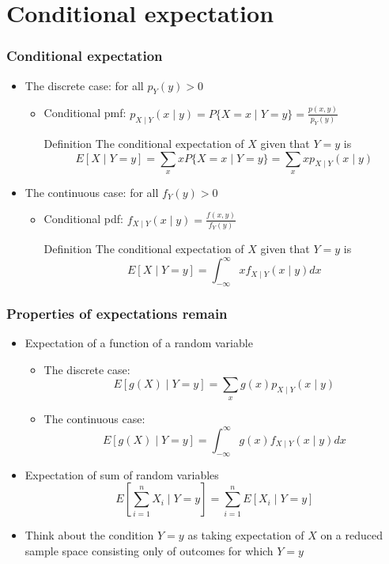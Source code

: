 \documentclass[slidestop,compress,mathserif]{beamer}
\begin{document}
\section{Conditional expectation}
\begin{frame}\frametitle{Conditional expectation}
\begin{itemize}
\item The discrete case: for all $p_Y(y) > 0$
\begin{itemize}
\item Conditional pmf: $p_{X \mid Y}(x \mid y) = P\{X = x \mid  Y = y\} = \frac{p(x, y)}{p_Y(y)}$
{\small{
\begin{block}{Definition}
The conditional expectation of $X$ given that $Y = y$ is
$$E[X \mid Y = y] = \sum_x xP\{X = x \mid  Y = y\} = \sum_x xp_{X \mid Y}(x \mid y)$$
\end{block}
}}
\end{itemize}

\item The continuous case: for all $f_Y(y) > 0$
\begin{itemize}
\item Conditional pdf: $f_{X \mid Y}(x \mid y) = \frac{f(x, y)}{f_Y(y)}$
{\small{
\begin{block}{Definition}
The conditional expectation of $X$ given that $Y = y$ is
$$E[X \mid Y = y] = \int_{-\infty}^{\infty}xf_{X \mid Y}(x \mid y)dx$$
\end{block}
}}
\end{itemize}
\end{itemize}
\end{frame}

\begin{frame}\frametitle{Properties of expectations remain}
\begin{itemize}
\item Expectation of a function of a random variable
\begin{itemize}
\item The discrete case:
$$E[g(X) \mid Y = y] = \sum_x g(x)p_{X \mid Y}(x \mid y)$$
\item The continuous case:
$$E[g(X) \mid Y = y] = \int_{-\infty}^{\infty}g(x)f_{X \mid Y}(x \mid y)dx$$
\end{itemize}

\vspace{2mm}
\item Expectation of sum of random variables
$$E[\sum_{i=1}^n X_i \mid Y = y] = \sum_{i=1}^n E[X_i \mid Y = y]$$
\vspace{2mm}

\item Think about the condition $Y = y$ as taking expectation of $X$ on a reduced sample space consisting only of outcomes for which $Y = y$
\end{itemize}
\end{frame}
\end{document}
